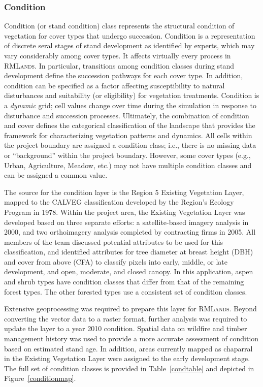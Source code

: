 \subsubsection{Condition}
Condition (or stand condition) class represents the structural condition of vegetation for cover types that undergo succession. Condition is a representation of discrete seral stages of stand development as identified by experts, which may vary considerably among cover types. It affects virtually every process in \textsc{RMLands}. In particular, transitions among condition classes during stand development define the succession pathways for each cover type. In addition, condition can be specified as a factor affecting susceptibility to natural disturbances and suitability (or eligibility) for vegetation treatments. Condition is a \emph{dynamic} grid; cell values change over time during the simulation in response to disturbance and succession processes. Ultimately, the combination of condition and cover defines the categorical classification of the landscape that provides the framework for characterizing vegetation patterns and dynamics. All cells within the project boundary are assigned a condition class; i.e., there is no missing data or ``background'' within the project boundary. However, some cover types (e.g., Urban, Agriculture, Meadow, etc.) may not have multiple condition classes and can be assigned a common value.

The source for the condition layer is the Region 5 Existing Vegetation Layer, mapped to the CALVEG classification developed by the Region's Ecology Program in 1978. Within the project area, the Existing Vegetation Layer was developed based on three separate efforts: a satellite-based imagery analysis in 2000, and two orthoimagery analysis completed by contracting firms in 2005. All members of the team discussed potential attributes to be used for this classification, and identified attributes for tree diameter at breast height (DBH) and cover from above (CFA) to classify pixels into early, middle, or late development, and open, moderate, and closed canopy. In this application, aspen and shrub types have condition classes that differ from that of the remaining forest types. The other forested types use a consistent set of condition classes.

Extensive geoprocessing was required to prepare this layer for \textsc{RMLands}. Beyond converting the vector data to a raster format, further analysis was required to update the layer to a year 2010 condition. Spatial data on wildfire and timber management history was used to provide a more accurate assessment of condition based on estimated stand age. In addition, areas currently mapped as chaparral in the Existing Vegetation Layer were assigned to the early development stage. The full set of condition classes is provided in Table~\ref{condtable} and depicted in Figure~\ref{conditionmap}.

